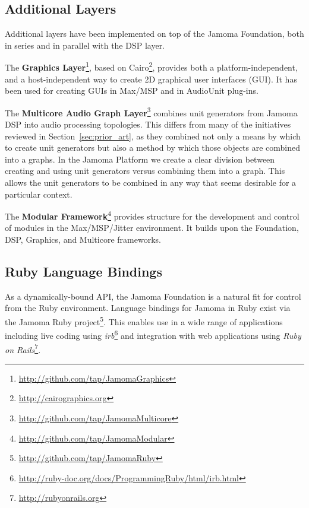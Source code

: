 \documentclass[twoside,10pt]{article}
\begin{document}


\subsection{Additional Layers} %

Additional layers have been implemented on top of the Jamoma Foundation, both in series and in parallel with the DSP layer.  

The \textbf{Graphics Layer}\footnote{\url{http://github.com/tap/JamomaGraphics}}, based on Cairo\footnote{\url{http://cairographics.org}}, provides both a platform-independent, and a host-independent way to create 2D graphical user interfaces (GUI). It has been used for creating GUIs in Max/MSP and in AudioUnit plug-ins.

The \textbf{Multicore Audio Graph Layer}\footnote{\url{http://github.com/tap/JamomaMulticore}} combines unit generators from Jamoma DSP into audio processing topologies.  This differs from many of the initiatives reviewed in Section~\ref{sec:prior_art}, as they combined not only a means by which to create unit generators but also a method by which those objects are combined into a graphs.  In the Jamoma Platform we create a clear division between creating and using unit generators versus combining them into a graph.  This allows the unit generators to be combined in any way that seems desirable for a particular context.

The \textbf{Modular Framework}\footnote{\url{http://github.com/tap/JamomaModular}} provides structure for the development and control of modules in the Max/MSP/Jitter environment.  It builds upon the Foundation, DSP, Graphics, and Multicore frameworks.



\subsection{Ruby Language Bindings} %

As a dynamically-bound API, the Jamoma Foundation is a natural fit for control from the Ruby environment.  Language bindings for Jamoma in Ruby exist via the Jamoma Ruby project\footnote{\url{http://github.com/tap/JamomaRuby}}.  This enables use in a wide range of applications including live coding using \emph{irb}\footnote{\url{http://ruby-doc.org/docs/ProgrammingRuby/html/irb.html}} and integration with web applications using \emph{Ruby on Rails}\footnote{\url{http://rubyonrails.org}}.
\end{document}
